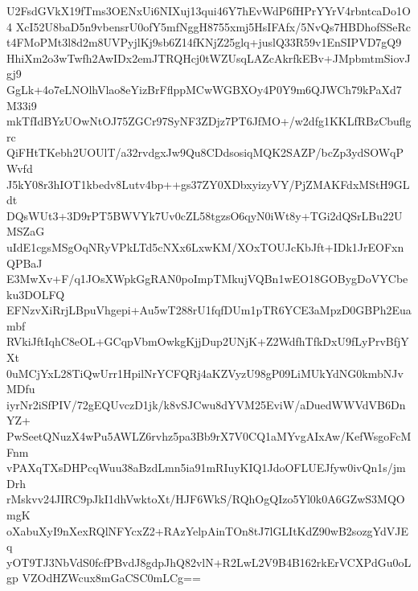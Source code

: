U2FsdGVkX19fTms3OENxUi6NIXuj13qui46Y7hEvWdP6fHPrYYrV4rbntcaDo1O4
XcI52U8baD5n9vbensrU0ofY5mfNggH8755xmj5HsIFAfx/5NvQs7HBDhofSSeRc
t4FMoPMt3l8d2m8UVPyjlKj9sb6Z14fKNjZ25glq+juslQ33R59v1EnSIPVD7gQ9
HhiXm2o3wTwfh2AwIDx2emJTRQHcj0tWZUsqLAZcAkrfkEBv+JMpbmtmSiovJgj9
GgLk+4o7eLNOlhVlao8eYizBrFflppMCwWGBXOy4P0Y9m6QJWCh79kPaXd7M33i9
mkTfIdBYzUOwNtOJ75ZGCr97SyNF3ZDjz7PT6JfMO+/w2dfg1KKLfRBzCbuflgrc
QiFHtTKebh2UOUlT/a32rvdgxJw9Qu8CDdsosiqMQK2SAZP/bcZp3ydSOWqPWvfd
J5kY08r3hIOT1kbedv8Lutv4bp++gs37ZY0XDbxyizyVY/PjZMAKFdxMStH9GLdt
DQsWUt3+3D9rPT5BWVYk7Uv0cZL58tgzsO6qyN0iWt8y+TGi2dQSrLBu22UMSZaG
uIdE1cgsMSgOqNRyVPkLTd5cNXx6LxwKM/XOxTOUJcKbJft+IDk1JrEOFxnQPBaJ
E3MwXv+F/q1JOsXWpkGgRAN0poImpTMkujVQBn1wEO18GOBygDoVYCbeku3DOLFQ
EFNzvXiRrjLBpuVhgepi+Au5wT288rU1fqfDUm1pTR6YCE3aMpzD0GBPh2Euambf
RVkiJftIqhC8eOL+GCqpVbmOwkgKjjDup2UNjK+Z2WdfhTfkDxU9fLyPrvBfjYXt
0uMCjYxL28TiQwUrr1HpilNrYCFQRj4aKZVyzU98gP09LiMUkYdNG0kmbNJvMDfu
iyrNr2iSfPIV/72gEQUvczD1jk/k8vSJCwu8dYVM25EviW/aDuedWWVdVB6DnYZ+
PwSeetQNuzX4wPu5AWLZ6rvhz5pa3Bb9rX7V0CQ1aMYvgAIxAw/KefWsgoFcMFnm
vPAXqTXsDHPcqWuu38aBzdLmn5ia91mRIuyKIQ1JdoOFLUEJfyw0ivQn1s/jmDrh
rMskvv24JIRC9pJkI1dhVwktoXt/HJF6WkS/RQhOgQIzo5Yl0k0A6GZwS3MQOmgK
oXabuXyI9nXexRQlNFYcxZ2+RAzYelpAinTOn8tJ7lGLItKdZ90wB2sozgYdVJEq
yOT9TJ3NbVdS0fcfPBvdJ8gdpJhQ82vlN+R2LwL2V9B4B162rkErVCXPdGu0oLgp
VZOdHZWcux8mGaCSC0mLCg==
